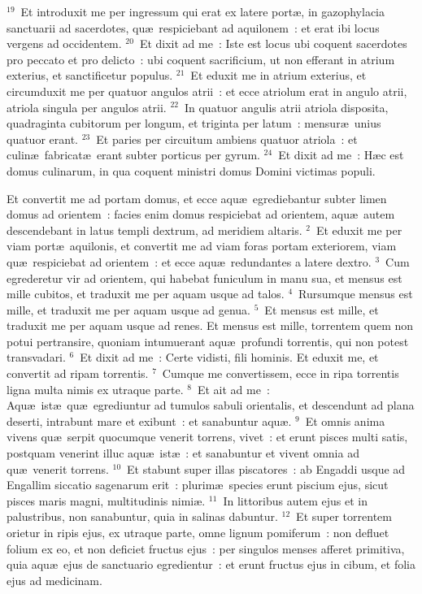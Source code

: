 ${}^{19}$~Et introduxit me per ingressum qui erat ex latere port\ae , in gazophylacia sanctuarii ad sacerdotes, qu\ae\ respiciebant ad aquilonem~: et erat ibi locus vergens ad occidentem.
${}^{20}$~Et dixit ad me~: Iste est locus ubi coquent sacerdotes pro peccato et pro delicto~: ubi coquent sacrificium, ut non efferant in atrium exterius, et sanctificetur populus.
${}^{21}$~Et eduxit me in atrium exterius, et circumduxit me per quatuor angulos atrii~: et ecce atriolum erat in angulo atrii, atriola singula per angulos atrii.
${}^{22}$~In quatuor angulis atrii atriola disposita, quadraginta cubitorum per longum, et triginta per latum~: mensur\ae\ unius quatuor erant.
${}^{23}$~Et paries per circuitum ambiens quatuor atriola~: et culin\ae\ fabricat\ae\ erant subter porticus per gyrum.
${}^{24}$~Et dixit ad me~: H\ae c est domus culinarum, in qua coquent ministri domus Domini victimas populi.

\lettrine[lines=10,image=true,loversize=0.05,lraise=-0.03]{E}{}t convertit me ad portam domus, et ecce aqu\ae\ egrediebantur subter limen domus ad orientem~: facies enim domus respiciebat ad orientem, aqu\ae\ autem descendebant in latus templi dextrum, ad meridiem altaris.
${}^{2}$~Et eduxit me per viam port\ae\ aquilonis, et convertit me ad viam foras portam exteriorem, viam qu\ae\ respiciebat ad orientem~: et ecce aqu\ae\ redundantes a latere dextro.
${}^{3}$~Cum egrederetur vir ad orientem, qui habebat funiculum in manu sua, et mensus est mille cubitos, et traduxit me per aquam usque ad talos.
${}^{4}$~Rursumque mensus est mille, et traduxit me per aquam usque ad genua.
${}^{5}$~Et mensus est mille, et traduxit me per aquam usque ad renes. Et mensus est mille, torrentem quem non potui pertransire, quoniam intumuerant aqu\ae\ profundi torrentis, qui non potest transvadari.
${}^{6}$~Et dixit ad me~: Certe vidisti, fili hominis. Et eduxit me, et convertit ad ripam torrentis.
${}^{7}$~Cumque me convertissem, ecce in ripa torrentis ligna multa nimis ex utraque parte.
${}^{8}$~Et ait ad me~: Aqu\ae\ ist\ae\ qu\ae\ egrediuntur ad tumulos sabuli orientalis, et descendunt ad plana deserti, intrabunt mare et exibunt~: et sanabuntur aqu\ae .
${}^{9}$~Et omnis anima vivens qu\ae\ serpit quocumque venerit torrens, vivet~: et erunt pisces multi satis, postquam venerint illuc aqu\ae\ ist\ae~: et sanabuntur et vivent omnia ad qu\ae\ venerit torrens.
${}^{10}$~Et stabunt super illas piscatores~: ab Engaddi usque ad Engallim siccatio sagenarum erit~: plurim\ae\ species erunt piscium ejus, sicut pisces maris magni, multitudinis nimi\ae .
${}^{11}$~In littoribus autem ejus et in palustribus, non sanabuntur, quia in salinas dabuntur.
${}^{12}$~Et super torrentem orietur in ripis ejus, ex utraque parte, omne lignum pomiferum~: non defluet folium ex eo, et non deficiet fructus ejus~: per singulos menses afferet primitiva, quia aqu\ae\ ejus de sanctuario egredientur~: et erunt fructus ejus in cibum, et folia ejus ad medicinam.


